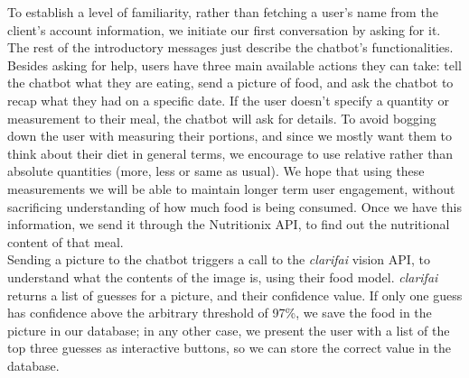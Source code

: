 To establish a level of familiarity, rather than fetching a user's name from the client's account information, we initiate our first conversation by asking for it. The rest of the introductory messages just describe the chatbot's functionalities.
Besides asking for help, users have three main available actions they can take: tell the chatbot what they are eating, send a picture of food, and ask the chatbot to recap what they had on a specific date. If the user doesn't specify a quantity or measurement to their meal, the chatbot will ask for details. To avoid bogging down the user with measuring their portions, and since we mostly want them to think about their diet in general terms, we encourage to use relative rather than absolute quantities (more, less or same as usual). We hope that using these measurements we will be able to maintain longer term user engagement, without sacrificing understanding of how much food is being consumed. Once we have this information, we send it through the Nutritionix API, to find out the nutritional content of that meal. \\
Sending a picture to the chatbot triggers a call to the \textit{clarifai} vision API, to understand what the contents of the image is, using their food model. \textit{clarifai} returns a list of guesses for a picture, and their confidence value. If only one guess has confidence above the arbitrary threshold of 97\%, we save the food in the picture in our database; in any other case, we present the user with a list of the top three guesses as interactive buttons, so we can store the correct value in the database. \\
